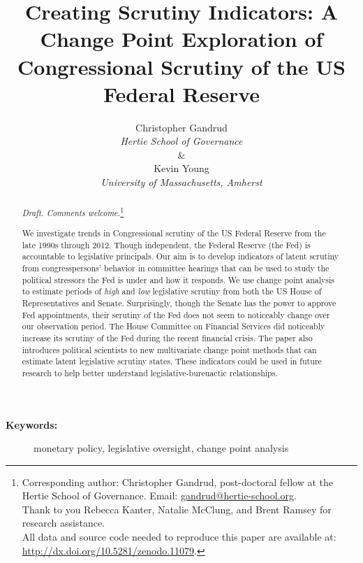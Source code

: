 \documentclass[a4paper]{article}\usepackage[]{graphicx}\usepackage[]{color}
\title{Creating Scrutiny Indicators: A Change Point Exploration of Congressional Scrutiny of the US Federal Reserve}
\author{Christopher Gandrud \\ {\emph{Hertie School of Governance}} \\ \& \\ Kevin Young \\ {\emph{University of Massachusetts, Amherst}}}
\begin{document}
\maketitle

\begin{abstract}

\noindent\emph{Draft. Comments welcome.}\footnote{Corresponding author: Christopher Gandrud, post-doctoral fellow at the Hertie School of Governance. Email: \href{mailto:gandrud@hertie-school.org}{gandrud@hertie-school.org}. \\ Thank to you Rebecca Kanter, Natalie McClung, and Brent Ramsey for research assistance. \\
All data and source code needed to reproduce this paper are available at: \url{http://dx.doi.org/10.5281/zenodo.11079}.}

We investigate trends in Congressional scrutiny of the US Federal Reserve from the late 1990s through 2012. Though independent, the Federal Reserve (the Fed) is accountable to legislative principals. Our aim is to develop indicators of latent scrutiny from congresspersons' behavior in committee hearings that can be used to study the political stressors the Fed is under and how it responds. We use change point analysis to estimate periods of \emph{high} and \emph{low} legislative scrutiny from both the US House of Representatives and Senate. Surprisingly, though the Senate has the power to approve Fed appointments, their scrutiny of the Fed does not seem to noticeably change over our observation period. The House Committee on Financial Services did noticeably increase its scrutiny of the Fed during the recent financial crisis. The paper also introduces political scientists to new multivariate change point methods that can estimate latent legislative scrutiny states. These indicators could be used in future research to help better understand legislative-bureuactic relationships.

\end{abstract}

\begin{description}
  \item [{\textbf{Keywords:}}] monetary policy, legislative oversight, change point analysis
\end{description}
\end{document}
